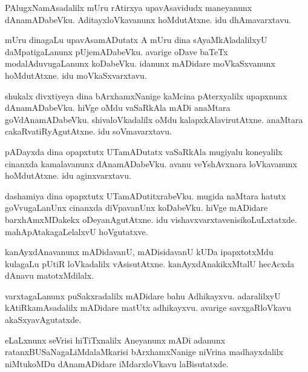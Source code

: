 \documentclass{article}
\begin{document}
\begin{mn}
PAlugxNamAsadalilx  mUru  rAtirxya  upavAsavidudx  maneyanunx  dAnamADabeVku.  
AditayxloVkavanunx  hoMdutAtxne.  idu  dhAmavarxtavu.
\end{mn}

\begin{mn}
mUru  dinagaLu  upavAsamADutatx  A  mUru  dina  sAyaMkAladalilxyU  daMpatigaLanunx  
pUjemADabeVku.  avarige  oDave  baTeTx  modalAduvugaLanunx  koDabeVku.  idanunx  
mADidare  moVkaSxvanunx  hoMdutAtxne.  idu  moVkaSxvarxtavu.
\end{mn}

\begin{mn}
shukalx  divxtiyeya  dina  bArxhamxNanige  kaMcina  pAterxyalilx  upapxnunx  dAnamADabeVku.  
hiVge  oMdu  vaSaRkAla  mADi  anaMtara  goVdAnamADabeVku.  shivaloVkadalilx  oMdu  
kalapxkAlavirutAtxne.  anaMtara  cakaRvatiRyAgutAtxne.  idu  soVmavarxtavu.
\end{mn}

\begin{mn}
pADayxda  dina  opapxtutx  UTamADutatx  vaSaRkAla  mugiyalu  koneyalilx  cinanxda  kamalavanunx  
dAnamADabeVku.  avanu  veYshAvxnara  loVkavanunx  hoMdutAtxne.  idu  aginxvarxtavu.
\end{mn}

\begin{mn}
dashamiya  dina  opapxtutx  UTamADutitxrabeVku.  mugida  naMtara  hatutx  goVvugaLanUnx  
cinanxda  diVpavanUnx  koDabeVku.  hiVge  mADidare  barxhAmxMDakekx  oDeyanAgutAtxne.  
idu  vishavxvarxtavenisikoLuLxtatxde.  mahApAtakagaLelalxvU  hoVgutatxve.
\end{mn}

\begin{mn}
kanAyxdAnavanunx  mADidavanU,  mADisidavanU  kUDa  ipapxtotxMdu  kulagaLu  pUtiR  
loVkadalilx  vAsisutAtxne.  kanAyxdAnakikxMtalU  hecAcxda  dAnavu  matotxMdilalx.
\end{mn}

\begin{mn}
varxtagaLanunx  puSakxradalilx  mADidare  bahu  Adhikayxvu.  adaralilxyU  kAtiRkamAsadalilx  
mADidare  matUtx  adhikayxvu.  avarige  savxgaRloVkavu  akaSxyavAgutatxde.
\end{mn}

\begin{mn}
eLaLxnunx  seVrisi  hiTiTxnalilx  Aneyanunx  mADi  adanunx  ratanxBUSaNagaLiMdalaMkarisi  
bArxhamxNanige  niVrina  madhayxdalilx  niMtukoMDu  dAnamADidare  iMdarxloVkavu  laBisutatxde.
\end{mn}
\end{document}
